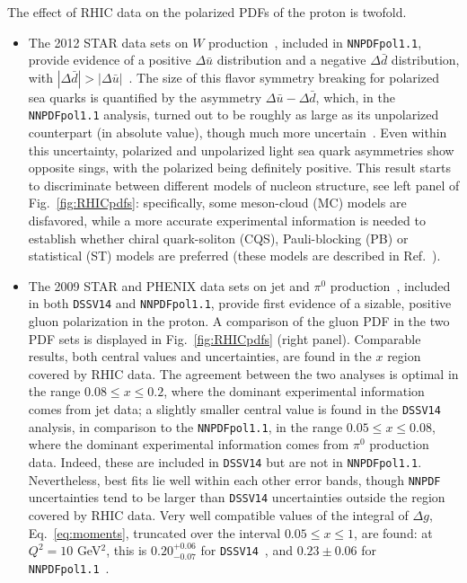 
The effect of RHIC data on the polarized PDFs of the proton is twofold.  
\begin{itemize}
\item The 2012 STAR data sets on $W$ production~\cite{Adamczyk:2014xyw}, 
included in {\tt NNPDFpol1.1}, provide evidence of a positive 
$\Delta\bar{u}$ distribution 
and a negative $\Delta\bar{d}$ distribution, with 
$|\Delta\bar{d}|>|\Delta\bar{u}|$~\cite{Nocera:2014gqa}. 
The size of this flavor symmetry breaking for polarized sea quarks is 
quantified by the asymmetry $\Delta\bar{u}-\Delta\bar{d}$, which,
in the {\tt NNPDFpol1.1} analysis, turned out to be roughly as large as its 
unpolarized counterpart (in absolute value), 
though much more uncertain~\cite{Nocera:2014rea}. Even within this uncertainty,
polarized and unpolarized light sea quark asymmetries show opposite sings,
with the polarized being definitely positive.  
This result starts to discriminate between different 
models of nucleon structure, see left panel of Fig.~\ref{fig:RHICpdfs}: 
specifically, some meson-cloud (MC) models are disfavored, while a more 
accurate experimental information is needed to establish whether 
chiral quark-soliton (CQS), Pauli-blocking (PB) or statistical (ST)
models are preferred (these models are described in 
Ref.~\cite{Chang:2014jba}).

\item The 2009 STAR and PHENIX data sets on jet and $\pi^0$ 
production~\cite{Adamczyk:2014ozi,Adare:2014hsq}, included in both {\tt DSSV14}
and {\tt NNPDFpol1.1}, provide first evidence
of a sizable, positive gluon polarization in the proton. 
A comparison of the gluon PDF in the two PDF sets is displayed in 
Fig.~\ref{fig:RHICpdfs} (right panel). Comparable results, both central values 
and uncertainties, are found in the $x$ region covered by RHIC data. 
The agreement between the two analyses is optimal in the
range $0.08\leq x \leq 0.2$, where the dominant experimental information comes
from jet data; a slightly smaller central value is found in the {\tt DSSV14} 
analysis, in comparison to the {\tt NNPDFpol1.1}, in the range 
$0.05\leq x \leq 0.08$, where the dominant experimental information comes from 
$\pi^0$ production data. Indeed, these are included in {\tt DSSV14} but are not
in {\tt NNPDFpol1.1}. Nevertheless, best fits lie well within each other error
bands, though {\tt NNPDF} uncertainties tend to be larger than {\tt DSSV14}
uncertainties outside the region covered by RHIC data.
Very well compatible values of the integral of $\Delta g$, 
Eq.~\eqref{eq:moments}, truncated over the interval $0.05\leq x \leq 1$, are 
found: at $Q^2=10$ GeV$^2$, this is $0.20^{+0.06}_{-0.07}$ for 
{\tt DSSV14}~\cite{deFlorian:2014yva}, and $0.23\pm 0.06$ for 
{\tt NNPDFpol1.1}~\cite{Nocera:2014gqa}.
\end{itemize}


